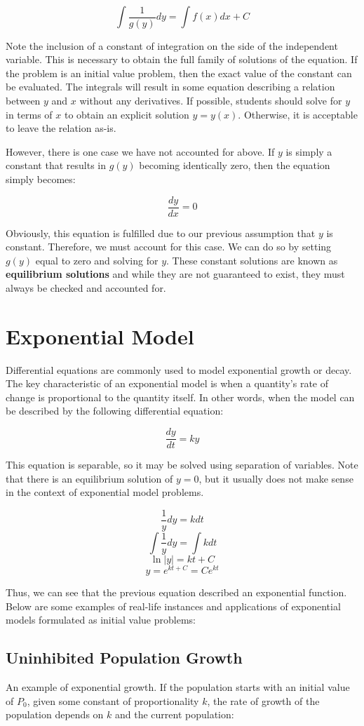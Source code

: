 \documentclass[11pt]{article}
\begin{document}
\[ \int \frac{1}{g(y)}dy = \int f(x)dx + C \]

Note the inclusion of a constant of integration on the side of the independent variable. This is necessary to obtain the full family of solutions of the equation. If the problem is an initial value problem, then the exact value of the constant can be evaluated. The integrals will result in some equation describing a relation between $y$ and $x$ without any derivatives. If possible, students should solve for $y$ in terms of $x$ to obtain an explicit solution $y=y(x)$. Otherwise, it is acceptable to leave the relation as-is.

However, there is one case we have not accounted for above. If $y$ is simply a constant that results in $g(y)$ becoming identically zero, then the equation simply becomes:

\[ \frac{dy}{dx} = 0 \]

Obviously, this equation is fulfilled due to our previous assumption that $y$ is constant. Therefore, we must account for this case. We can do so by setting $g(y)$ equal to zero and solving for $y$. These constant solutions are known as \textbf{equilibrium solutions} and while they are not guaranteed to exist, they must always be checked and accounted for. 

\section{Exponential Model}
Differential equations are commonly used to model exponential growth or decay. The key characteristic of an exponential model is when a quantity's rate of change is proportional to the quantity itself. In other words, when the model can be described by the following differential equation:

\[ \frac{dy}{dt} = ky \]

This equation is separable, so it may be solved using separation of variables. Note that there is an equilibrium solution of $y=0$, but it usually does not make sense in the context of exponential model problems.

\[ \frac{1}{y}dy = kdt \]
\[ \int \frac{1}{y}dy = \int kdt \]
\[ \ln{|y|} = kt + C \]
\[ y = e^{kt+C} = Ce^{kt} \]

Thus, we can see that the previous equation described an exponential function. Below are some examples of real-life instances and applications of exponential models formulated as initial value problems:

\subsection*{Uninhibited Population Growth}
An example of exponential growth. If the population starts with an initial value of $P_0$, given some constant of proportionality $k$, the rate of growth of the population depends on $k$ and the current population:
\end{document}
